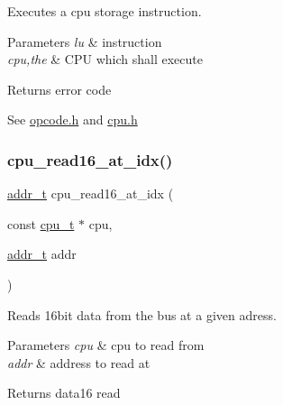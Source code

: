 Executes a cpu storage instruction. 


\begin{DoxyParams}{Parameters}
{\em lu} & instruction \\
\hline
{\em cpu,the} & C\+PU which shall execute \\
\hline
\end{DoxyParams}
\begin{DoxyReturn}{Returns}
error code
\end{DoxyReturn}
See \hyperlink{opcode_8h}{opcode.\+h} and \hyperlink{cpu_8h}{cpu.\+h} \mbox{\label{cpu-storage_8h_aa4dd23db2c717ae059d9daff6051501b}} 
\subsubsection{\texorpdfstring{cpu\+\_\+read16\+\_\+at\+\_\+idx()}{cpu\_read16\_at\_idx()}}
{\footnotesize\ttfamily \hyperlink{memory_8h_a8a6444037e4d5cc2bf8ba22a9d9e33ca}{addr\+\_\+t} cpu\+\_\+read16\+\_\+at\+\_\+idx (\begin{DoxyParamCaption}\item[{const \hyperlink{structcpu__t}{cpu\+\_\+t} $\ast$}]{cpu,  }\item[{\hyperlink{memory_8h_a8a6444037e4d5cc2bf8ba22a9d9e33ca}{addr\+\_\+t}}]{addr }\end{DoxyParamCaption})}



Reads 16bit data from the bus at a given adress. 


\begin{DoxyParams}{Parameters}
{\em cpu} & cpu to read from \\
\hline
{\em addr} & address to read at\\
\hline
\end{DoxyParams}
\begin{DoxyReturn}{Returns}
data16 read 
\end{DoxyReturn}
\mbox{\label{cpu-storage_8h_a344ca7bbdfd21880efbf1fa20c5750b9}} 
